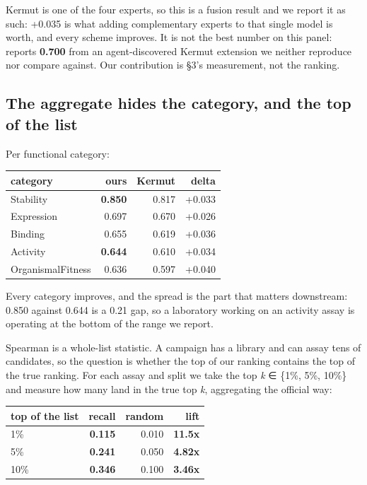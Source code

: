 \documentclass{article}
\begin{document}
Kermut is one of the four experts, so this is a fusion result and we report it as such: +0.035 is what adding
complementary experts to that single model is worth, and every scheme improves. It is not the best number on this panel: \cite{gao2026autoscientists} reports \textbf{0.700} from an
agent-discovered Kermut extension we neither reproduce nor compare against. Our contribution is §3's measurement, not
the ranking.

\subsection{The aggregate hides the category, and the top of the list}\label{the-aggregate-hides-the-category-and-the-top-of-the-list}

Per functional category:

\begin{table}[!t]
\centering
\small
\begin{tabular}{lrrr}
\hline
category & ours & Kermut & delta \\
\hline
Stability & \textbf{0.850} & 0.817 & +0.033 \\
Expression & 0.697 & 0.670 & +0.026 \\
Binding & 0.655 & 0.619 & +0.036 \\
Activity & \textbf{0.644} & 0.610 & +0.034 \\
OrganismalFitness & 0.636 & 0.597 & +0.040 \\
\hline
\end{tabular}
\end{table}

Every category improves, and the spread is the part that matters downstream: 0.850 against 0.644 is a
0.21 gap, so a laboratory working on an activity assay is operating at the bottom of the range we report.

Spearman is a whole-list statistic. A campaign has a library and can assay tens of candidates, so the
question is whether the top of our ranking contains the top of the true ranking. For each assay and split
we take the top \emph{k} ∈ \{1\%, 5\%, 10\%\} and measure how many land in the true top \emph{k}, aggregating the
official way:

\begin{table}[!t]
\centering
\small
\begin{tabular}{lrrr}
\hline
top of the list & recall & random & lift \\
\hline
1\% & \textbf{0.115} & 0.010 & \textbf{11.5x} \\
5\% & \textbf{0.241} & 0.050 & \textbf{4.82x} \\
10\% & \textbf{0.346} & 0.100 & \textbf{3.46x} \\
\hline
\end{tabular}
\end{table}
\end{document}
